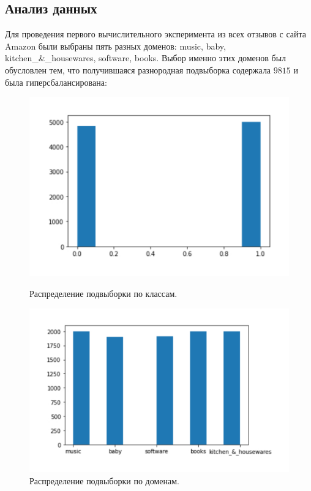 \documentclass[12pt, twoside]{article}
\begin{document}
\subsection{Анализ данных}
Для проведения первого вычислительного эксперимента из всех отзывов с сайта Amazon были выбраны пять разных доменов: music, baby, kitchen\_\&\_housewares, software, books. Выбор именно этих доменов был  обусловлен тем, что получившаяся разнородная подвыборка содержала $9815$ и была гиперсбалансирована:
\begin{figure}[h]
\begin{center}
\begin{minipage}[h]{0.4\linewidth}
\includegraphics[width=1\linewidth]{fig/classes_dist.pdf}
\caption{Распределение подвыборки по классам.} %
\end{minipage}
\hfill
\begin{minipage}[h]{0.4\linewidth}
\includegraphics[width=1\linewidth]{fig/domens_dist.pdf}
\caption{Распределение подвыборки по доменам.}
\end{minipage}
\end{center}
\end{figure}
\end{document}
